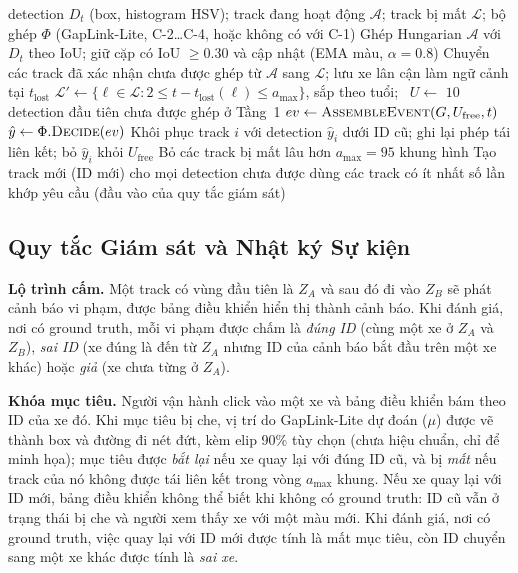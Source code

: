 \begin{algorithm}[H]
\caption{Một khung hình của tracker trực tuyến hai tầng}
\label{alg:tracker}
\begin{algorithmic}[1]
\Require detection $D_t$ (box, histogram HSV); track đang hoạt động $\mathcal{A}$; track bị mất $\mathcal{L}$; bộ ghép $\Phi$ (GapLink-Lite, C-2\dots C-4, hoặc không có với C-1)
\State Ghép Hungarian $\mathcal{A}$ với $D_t$ theo IoU; giữ cặp có IoU $\ge 0.30$ và cập nhật (EMA màu, $\alpha = 0.8$)
\State Chuyển các track đã xác nhận chưa được ghép từ $\mathcal{A}$ sang $\mathcal{L}$; lưu xe lân cận làm ngữ cảnh tại $t_{\text{lost}}$
\State $\mathcal{L}' \gets \{\ell \in \mathcal{L} : 2 \le t - t_{\text{lost}}(\ell) \le a_{\max}\}$, sắp theo tuổi; \ $U \gets$ $10$ detection đầu tiên chưa được ghép ở Tầng~1
        \State $ev \gets \textsc{AssembleEvent}(G, U_{\text{free}}, t)$ 
        \State $\hat{y} \gets \Phi.\textsc{Decide}(ev)$ 
            \State Khôi phục track $i$ với detection $\hat{y}_i$ dưới ID cũ; ghi lại phép tái liên kết; bỏ $\hat{y}_i$ khỏi $U_{\text{free}}$
        \EndFor
    \EndFor
\EndIf
\State Bỏ các track bị mất lâu hơn $a_{\max} = 95$ khung hình
\State Tạo track mới (ID mới) cho mọi detection chưa được dùng
\State \Return các track có ít nhất số lần khớp yêu cầu (đầu vào của quy tắc giám sát)
\end{algorithmic}
\end{algorithm}

\subsection{Quy tắc Giám sát và Nhật ký Sự kiện}
\label{sec:surveillance_rules}

\textbf{Lộ trình cấm.} Một track có vùng đầu tiên là $Z_A$ và sau đó đi vào $Z_B$ sẽ phát cảnh báo vi phạm, được bảng điều khiển hiển thị thành cảnh báo. Khi đánh giá, nơi có ground truth, mỗi vi phạm được chấm là \emph{đúng ID} (cùng một xe ở $Z_A$ và $Z_B$), \emph{sai ID} (xe đúng là đến từ $Z_A$ nhưng ID của cảnh báo bắt đầu trên một xe khác) hoặc \emph{giả} (xe chưa từng ở $Z_A$).

\textbf{Khóa mục tiêu.} Người vận hành click vào một xe và bảng điều khiển bám theo ID của xe đó. Khi mục tiêu bị che, vị trí do GapLink-Lite dự đoán ($\mu$) được vẽ thành box và đường đi nét đứt, kèm elip 90\% tùy chọn (chưa hiệu chuẩn, chỉ để minh họa); mục tiêu được \emph{bắt lại} nếu xe quay lại với đúng ID cũ, và bị \emph{mất} nếu track của nó không được tái liên kết trong vòng $a_{\max}$ khung. Nếu xe quay lại với ID mới, bảng điều khiển không thể biết khi không có ground truth: ID cũ vẫn ở trạng thái bị che và người xem thấy xe với một màu mới. Khi đánh giá, nơi có ground truth, việc quay lại với ID mới được tính là mất mục tiêu, còn ID chuyển sang một xe khác được tính là \emph{sai xe}.

